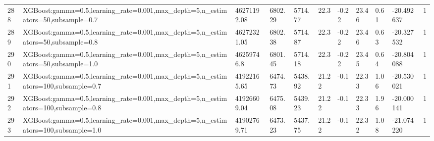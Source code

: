 \begin{longtable}{C{0.8cm} L{2cm} C{1.15cm} C{1.15cm} C{1.15cm} C{1.15cm} C{0.85cm} C{1.25cm} C{1.2cm} C{1.5cm} C{1.0cm}}
288 & XGBoost:\newline gamma=0.5,\newline learning\_rate=0.001,\newline max\_depth=5,\newline n\_estimators=50,\newline subsample=0.7 & 46271192.08 & 6802.29 & 5714.77 & 22.3 & -0.22 & 23.46 & 0.61 & -20.492637 & 1 \\
289 & XGBoost:\newline gamma=0.5,\newline learning\_rate=0.001,\newline max\_depth=5,\newline n\_estimators=50,\newline subsample=0.8 & 46272321.05 & 6802.38 & 5714.87 & 22.3 & -0.22 & 23.46 & 0.63 & -20.327532 & 1 \\
290 & XGBoost:\newline gamma=0.5,\newline learning\_rate=0.001,\newline max\_depth=5,\newline n\_estimators=50,\newline subsample=1.0 & 46259746.8 & 6801.45 & 5714.18 & 22.3 & -0.22 & 23.45 & 0.64 & -20.804088 & 1 \\
291 & XGBoost:\newline gamma=0.5,\newline learning\_rate=0.001,\newline max\_depth=5,\newline n\_estimators=100,\newline subsample=0.7 & 41922165.65 & 6474.73 & 5438.92 & 21.22 & -0.1 & 22.33 & 1.06 & -20.530021 & 1 \\
292 & XGBoost:\newline gamma=0.5,\newline learning\_rate=0.001,\newline max\_depth=5,\newline n\_estimators=100,\newline subsample=0.8 & 41926609.04 & 6475.08 & 5439.23 & 21.22 & -0.1 & 22.33 & 1.96 & -20.000141 & 1 \\
293 & XGBoost:\newline gamma=0.5,\newline learning\_rate=0.001,\newline max\_depth=5,\newline n\_estimators=100,\newline subsample=1.0 & 41902769.71 & 6473.23 & 5437.75 & 21.22 & -0.1 & 22.32 & 1.08 & -21.074220 & 1 \\

\end{longtable}
